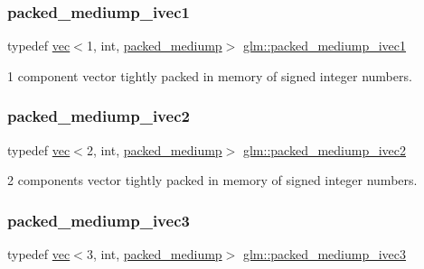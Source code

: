 \subsubsection{\texorpdfstring{packed\+\_\+mediump\+\_\+ivec1}{packed\_mediump\_ivec1}}
{\footnotesize\ttfamily typedef \hyperlink{structglm_1_1vec}{vec}$<$1, int, \hyperlink{namespaceglm_a36ed105b07c7746804d7fdc7cc90ff25a9604654c3b137cd7898689fd34b25bc0}{packed\+\_\+mediump}$>$ \hyperlink{group__gtc__type__aligned_ga2086cbb8b85fe406f4be46fdff491304}{glm\+::packed\+\_\+mediump\+\_\+ivec1}}



1 component vector tightly packed in memory of signed integer numbers. 

\mbox{\label{group__gtc__type__aligned_ga42af0b51e654d83bd9201e96308942b5}} 
\subsubsection{\texorpdfstring{packed\+\_\+mediump\+\_\+ivec2}{packed\_mediump\_ivec2}}
{\footnotesize\ttfamily typedef \hyperlink{structglm_1_1vec}{vec}$<$2, int, \hyperlink{namespaceglm_a36ed105b07c7746804d7fdc7cc90ff25a9604654c3b137cd7898689fd34b25bc0}{packed\+\_\+mediump}$>$ \hyperlink{group__gtc__type__aligned_ga42af0b51e654d83bd9201e96308942b5}{glm\+::packed\+\_\+mediump\+\_\+ivec2}}



2 components vector tightly packed in memory of signed integer numbers. 

\mbox{\label{group__gtc__type__aligned_ga7f737483a80a724f8fde24e8402616f8}} 
\subsubsection{\texorpdfstring{packed\+\_\+mediump\+\_\+ivec3}{packed\_mediump\_ivec3}}
{\footnotesize\ttfamily typedef \hyperlink{structglm_1_1vec}{vec}$<$3, int, \hyperlink{namespaceglm_a36ed105b07c7746804d7fdc7cc90ff25a9604654c3b137cd7898689fd34b25bc0}{packed\+\_\+mediump}$>$ \hyperlink{group__gtc__type__aligned_ga7f737483a80a724f8fde24e8402616f8}{glm\+::packed\+\_\+mediump\+\_\+ivec3}}



